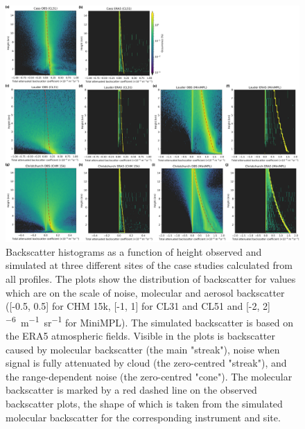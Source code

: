 \begin{figure}[p]
\centering
\includegraphics[width=\textwidth]{chapter3/fig/backscatter_hist_micro.png}
\caption[Backscatter histograms as a function of height]{
Backscatter histograms as a function of height observed and simulated
at three different sites of the case studies calculated from all profiles.
The plots show the distribution
of backscatter for values which are on the scale of noise, molecular and
aerosol backscatter ([-0.5, 0.5] for CHM 15k, [-1, 1] for CL31 and CL51 and 
[-2, 2] \unit{^{-6}m^{-1}sr^{-1}} for MiniMPL).
The simulated backscatter is based on the ERA5
atmospheric fields. Visible in the plots is backscatter caused by molecular
backscatter (the main "streak"), noise when signal is fully attenuated by cloud
(the zero-centred "streak"), and the range-dependent noise
(the zero-centred "cone"). The molecular backscatter is marked by a red dashed
line on the observed backscatter plots, the shape of which is taken from
the simulated molecular backscatter for the corresponding instrument and site.
}
\label{fig:3:micro-backscatter}
\end{figure}

